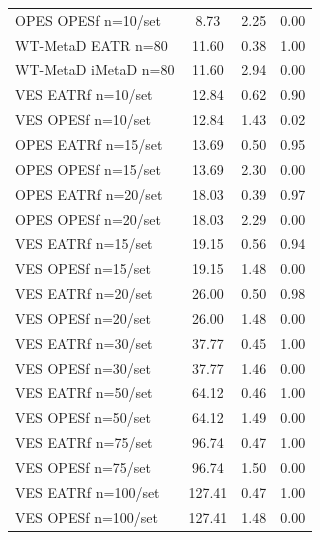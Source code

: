 \begin{longtable}{lccc}
OPES OPESf n=10/set & 8.73 & 2.25 & 0.00 \\
WT-MetaD EATR n=80 & 11.60 & 0.38 & 1.00 \\
WT-MetaD iMetaD n=80 & 11.60 & 2.94 & 0.00 \\
VES EATRf n=10/set & 12.84 & 0.62 & 0.90 \\
VES OPESf n=10/set & 12.84 & 1.43 & 0.02 \\
OPES EATRf n=15/set & 13.69 & 0.50 & 0.95 \\
OPES OPESf n=15/set & 13.69 & 2.30 & 0.00 \\
OPES EATRf n=20/set & 18.03 & 0.39 & 0.97 \\
OPES OPESf n=20/set & 18.03 & 2.29 & 0.00 \\
VES EATRf n=15/set & 19.15 & 0.56 & 0.94 \\
VES OPESf n=15/set & 19.15 & 1.48 & 0.00 \\
VES EATRf n=20/set & 26.00 & 0.50 & 0.98 \\
VES OPESf n=20/set & 26.00 & 1.48 & 0.00 \\
VES EATRf n=30/set & 37.77 & 0.45 & 1.00 \\
VES OPESf n=30/set & 37.77 & 1.46 & 0.00 \\
VES EATRf n=50/set & 64.12 & 0.46 & 1.00 \\
VES OPESf n=50/set & 64.12 & 1.49 & 0.00 \\
VES EATRf n=75/set & 96.74 & 0.47 & 1.00 \\
VES OPESf n=75/set & 96.74 & 1.50 & 0.00 \\
VES EATRf n=100/set & 127.41 & 0.47 & 1.00 \\
VES OPESf n=100/set & 127.41 & 1.48 & 0.00\\ \bottomrule
\end{longtable}
